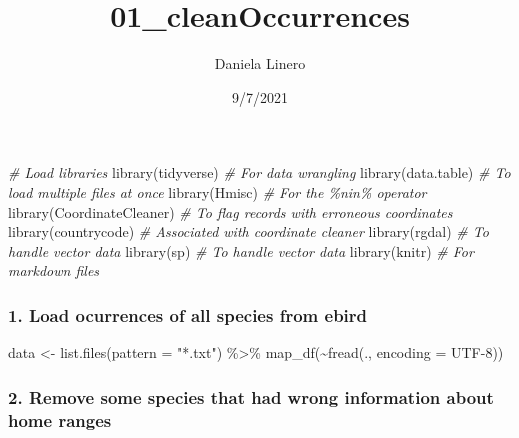 \documentclass[
]{article}
\title{01\_cleanOccurrences}
\author{Daniela Linero}
\date{9/7/2021}
\newenvironment{Shaded}{\begin{snugshade}}{\end{snugshade}}
\newcommand{\AttributeTok}[1]{\textcolor[rgb]{0.77,0.63,0.00}{#1}}
\newcommand{\CommentTok}[1]{\textcolor[rgb]{0.56,0.35,0.01}{\textit{#1}}}
\newcommand{\FunctionTok}[1]{\textcolor[rgb]{0.00,0.00,0.00}{#1}}
\newcommand{\NormalTok}[1]{#1}
\newcommand{\OtherTok}[1]{\textcolor[rgb]{0.56,0.35,0.01}{#1}}
\newcommand{\SpecialCharTok}[1]{\textcolor[rgb]{0.00,0.00,0.00}{#1}}
\newcommand{\StringTok}[1]{\textcolor[rgb]{0.31,0.60,0.02}{#1}}
\begin{document}
\maketitle

\begin{Shaded}
\begin{Highlighting}[]
\CommentTok{\# Load libraries}
\FunctionTok{library}\NormalTok{(tidyverse) }\CommentTok{\# For data wrangling}
\FunctionTok{library}\NormalTok{(data.table) }\CommentTok{\# To load multiple files at once}
\FunctionTok{library}\NormalTok{(Hmisc) }\CommentTok{\# For the \%nin\% operator }
\FunctionTok{library}\NormalTok{(CoordinateCleaner) }\CommentTok{\# To flag records with erroneous coordinates}
\FunctionTok{library}\NormalTok{(countrycode) }\CommentTok{\# Associated with coordinate cleaner}
\FunctionTok{library}\NormalTok{(rgdal) }\CommentTok{\# To handle vector data }
\FunctionTok{library}\NormalTok{(sp) }\CommentTok{\# To handle vector data }
\FunctionTok{library}\NormalTok{(knitr) }\CommentTok{\# For markdown files}
\end{Highlighting}
\end{Shaded}

\hypertarget{load-ocurrences-of-all-species-from-ebird}{%
\subsubsection{1. Load ocurrences of all species from
ebird}\label{load-ocurrences-of-all-species-from-ebird}}

\begin{Shaded}
\begin{Highlighting}[]
\NormalTok{data }\OtherTok{\textless{}{-}} 
  \FunctionTok{list.files}\NormalTok{(}\AttributeTok{pattern =} \StringTok{"*.txt"}\NormalTok{) }\SpecialCharTok{\%\textgreater{}\%} 
  \FunctionTok{map\_df}\NormalTok{(}\SpecialCharTok{\textasciitilde{}}\FunctionTok{fread}\NormalTok{(., }\AttributeTok{encoding =} \StringTok{\textquotesingle{}UTF{-}8\textquotesingle{}}\NormalTok{))}
\end{Highlighting}
\end{Shaded}

\hypertarget{remove-some-species-that-had-wrong-information-about-home-ranges}{%
\subsubsection{2. Remove some species that had wrong information about
home
ranges}\label{remove-some-species-that-had-wrong-information-about-home-ranges}}
\end{document}
